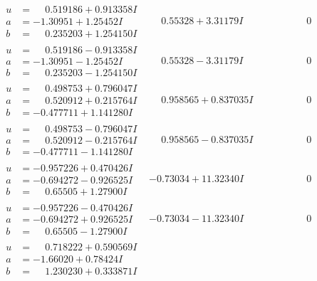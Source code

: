 \documentclass[1p]{elsarticle_modified}
\theoremstyle{definition}
\begin{document}
$$\begin{array}{c|c|c}
\begin{aligned}
u &= \phantom{-}0.519186 + 0.913358 I \\
a &= -1.30951 + 1.25452 I \\
b &= \phantom{-}0.235203 + 1.254150 I\end{aligned}
 & \phantom{-}0.55328 + 3.31179 I & \phantom{-0.000000 } 0 \\ \hline\begin{aligned}
u &= \phantom{-}0.519186 - 0.913358 I \\
a &= -1.30951 - 1.25452 I \\
b &= \phantom{-}0.235203 - 1.254150 I\end{aligned}
 & \phantom{-}0.55328 - 3.31179 I & \phantom{-0.000000 } 0 \\ \hline\begin{aligned}
u &= \phantom{-}0.498753 + 0.796047 I \\
a &= \phantom{-}0.520912 + 0.215764 I \\
b &= -0.477711 + 1.141280 I\end{aligned}
 & \phantom{-}0.958565 + 0.837035 I & \phantom{-0.000000 } 0 \\ \hline\begin{aligned}
u &= \phantom{-}0.498753 - 0.796047 I \\
a &= \phantom{-}0.520912 - 0.215764 I \\
b &= -0.477711 - 1.141280 I\end{aligned}
 & \phantom{-}0.958565 - 0.837035 I & \phantom{-0.000000 } 0 \\ \hline\begin{aligned}
u &= -0.957226 + 0.470426 I \\
a &= -0.694272 - 0.926525 I \\
b &= \phantom{-}0.65505 + 1.27900 I\end{aligned}
 & -0.73034 + 11.32340 I & \phantom{-0.000000 } 0 \\ \hline\begin{aligned}
u &= -0.957226 - 0.470426 I \\
a &= -0.694272 + 0.926525 I \\
b &= \phantom{-}0.65505 - 1.27900 I\end{aligned}
 & -0.73034 - 11.32340 I & \phantom{-0.000000 } 0 \\ \hline\begin{aligned}
u &= \phantom{-}0.718222 + 0.590569 I \\
a &= -1.66020 + 0.78424 I \\
b &= \phantom{-}1.230230 + 0.333871 I\end{aligned}

\end{array}$$
\end{document}
